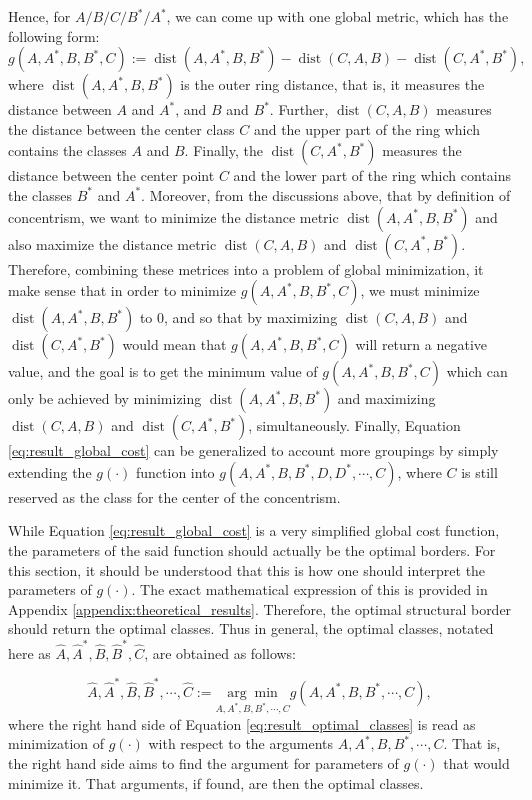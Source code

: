 Hence, for $A/B/C/B^*/A^*$, we can come up with one global metric, which has the following form:
\begin{equation}\label{eq:result_global_cost}
    g(A,A^*,B,B^*,C):=\operatorname{dist}(A,A^*,B,B^*)-\operatorname{dist}(C,A,B) - \operatorname{dist}(C,A^*,B^*),
\end{equation}
where $\operatorname{dist}(A,A^*,B,B^*)$ is the outer ring distance, that is, it measures the distance between $A$ and $A^*$, and $B$ and $B^*$. Further, $\operatorname{dist}(C,A,B)$ measures the distance between the center class $C$ and the upper part of the ring which contains the classes $A$ and $B$. Finally, the $\operatorname{dist}(C,A^*,B^*)$ measures the distance between the center point $C$ and the lower part of the ring which contains the classes $B^*$ and $A^*$. Moreover, from the discussions above, that by definition of concentrism, we want to minimize the distance metric $\operatorname{dist}(A,A^*,B,B^*)$ and also maximize the distance metric $\operatorname{dist}(C,A,B)$ and $\operatorname{dist}(C,A^*,B^*)$. Therefore, combining these metrices into a problem of global minimization, it make sense that in order to minimize $g(A,A^*,B,B^*,C)$, we must minimize $\operatorname{dist}(A,A^*,B,B^*)$ to 0, and so that by maximizing $\operatorname{dist}(C,A,B)$ and $\operatorname{dist}(C,A^*,B^*)$ would mean that $g(A,A^*,B,B^*,C)$ will return a negative value, and the goal is to get the minimum value of $g(A,A^*,B,B^*,C)$ which can only be achieved by minimizing $\operatorname{dist}(A,A^*,B,B^*)$ and maximizing $\operatorname{dist}(C,A,B)$ and $\operatorname{dist}(C,A^*,B^*)$, simultaneously. Finally, Equation \ref{eq:result_global_cost} can be generalized to account more groupings by simply extending the $g(\cdot)$ function into $g(A,A^*,B,B^*,D,D^*,\cdots, C)$, where $C$ is still reserved as the class for the center of the concentrism.

While Equation \ref{eq:result_global_cost} is a very simplified global cost function, the parameters of the said function should actually be the optimal borders. For this section, it should be understood that this is how one should interpret the parameters of $g(\cdot)$. The exact mathematical expression of this is provided in Appendix \ref{appendix:theoretical_results}. Therefore, the optimal structural border should return the optimal classes. Thus in general, the optimal classes, notated here as $\hat{A},\hat{A}^*,\hat{B},\hat{B}^*,\hat{C}$, are obtained as follows:

\begin{equation}\label{eq:result_optimal_classes}
    \hat{A},\hat{A}^*,\hat{B},\hat{B}^*,\cdots,\hat{C}:=\underset{A,A^{*},B,B^*,\cdots,C}{\arg\min}g(A,A^*,B,B^*,\cdots,C),
\end{equation}
where the right hand side of Equation \ref{eq:result_optimal_classes} is read as minimization of $g(\cdot)$ with respect to the arguments $A,A^*,B,B^*,\cdots,C$. That is, the right hand side aims to find the argument for parameters of $g(\cdot)$ that would minimize it. That arguments, if found, are then the optimal classes.

